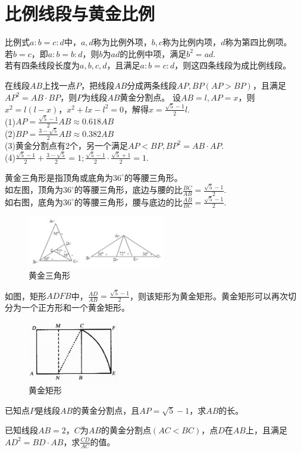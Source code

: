 \documentclass{ecnuthesis}
\begin{document}
\section{比例线段与黄金比例}
\begin{knowledge}
    比例式$a:b=c:d$中，$a,d$称为比例外项，$b,c$称为比例内项，$d$称为第四比例项。\\
    若$b=c$，即$a:b=b:d$，则$b$为$ad$的比例中项，满足$b^2=ad$. \\
    若有四条线段长度为$a,b,c,d$，且满足$a:b=c:d$，则这四条线段为成比例线段。
\end{knowledge}
\begin{knowledge}
    在线段$AB$上找一点$P$，把线段$AB$分成两条线段$AP,BP(AP>BP)$，且满足$AP^2=AB·BP$，则$P$为线段$AB$黄金分割点。
    设$AB=l,AP=x$，则$x^2=l(l-x)$，$x^2+lx-l^2=0$，解得$x=\frac{\sqrt5-1}{2}l$.\\
    (1)$AP=\frac{\sqrt5 - 1}{2}AB \approx 0.618AB$ \\
    (2)$BP=\frac{3 - \sqrt5}{2}AB \approx 0.382AB$ \\
    (3)黄金分割点有2个，另一个满足$AP<BP,BP^2=AB·AP.$ \\
    (4)$\frac{\sqrt5-1}{2}+\frac{3-\sqrt5}{2}=1;\frac{\sqrt5-1}{2}·\frac{\sqrt5+1}{2}=1$.
\end{knowledge}
\begin{model}
    黄金三角形是指顶角或底角为$36^\circ$的等腰三角形。\\
    如左图，顶角为$36^\circ$的等腰三角形，底边与腰的比$\frac{BC}{AB}=\frac{\sqrt5-1}{2}$. \\
    如右图，底角为$36^\circ$的等腰三角形，腰与底边的比$\frac{AB}{BC}=\frac{\sqrt5-1}{2}$.
\end{model}
\begin{figure}[H]
\centering
\includegraphics[width=6cm]{picture/801.png}
\caption{黄金三角形}
\end{figure}
\begin{model}
    如图，矩形$ADFB$中，$\frac{AD}{AB}=\frac{\sqrt5-1}{2}$，则该矩形为黄金矩形。黄金矩形可以再次切分为一个正方形和一个黄金矩形。
\end{model}
\begin{figure}[H]
\centering
\includegraphics[width=4cm]{picture/859.png}
\caption{黄金矩形}
\end{figure}
\begin{problem}
    已知点$P$是线段$AB$的黄金分割点，且$AP=\sqrt5-1$，求$AB$的长。
\end{problem}
\begin{problem}
    已知线段$AB=2$，$C$为$AB$的黄金分割点$(AC<BC)$，点$D$在$AB$上，且满足$AD^2=BD·AB$，求$\frac{CD}{AC}$的值。
\end{problem}
\clearpage
\end{document}
